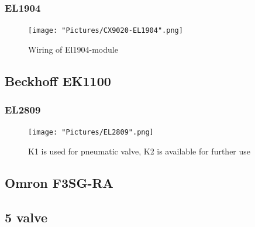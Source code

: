\documentclass{article}
\begin{document}
    \subsubsection{EL1904}
    
    \begin{figure}[!h]
        \centering
        \texttt{[image: "Pictures/CX9020-EL1904".png]}
        \caption{Wiring of El1904-module}
    \end{figure}
    
    \newpage
    
    \subsection{Beckhoff EK1100}
    \subsubsection{EL2809}
    
    \begin{figure}[!h]
        \centering
        \texttt{[image: "Pictures/EL2809".png]}
        \caption{K1 is used for pneumatic valve, K2 is available for further use}
    \end{figure}
    
    \newpage
    
    \subsection{Omron F3SG-RA}
    
    \newpage
    
    \subsection{5\2 valve}
    
    \newpage
    
    \subsection{}
    
    
        
\end{document}
